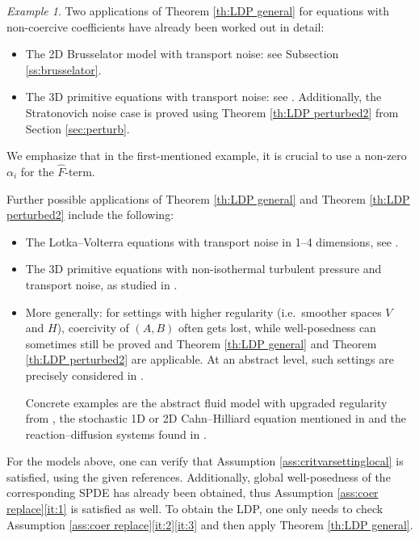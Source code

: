 \documentclass{amsart}
\newcommand{\<}{\langle}
\newcommand{\?}{\rangle}
\theoremstyle{plain}
\theoremstyle{remark}
\newtheorem{example}[theorem]{Example}
\theoremstyle{plain}
\numberwithin{equation}{section}
\begin{document}
\begin{example}\label{ex:applications}
Two applications of Theorem \ref{th:LDP general} for equations with non-coercive coefficients have already been worked out in detail: 
 \begin{itemize}
  \item The 2D Brusselator model with transport noise: see Subsection \ref{ss:brusselator}. 
 \item The 3D primitive equations  with transport noise: see \cite[Th.\ 2.7]{AT25}. Additionally, the Stratonovich noise case \cite[Th.\ 2.9]{AT25} is  proved using Theorem \ref{th:LDP perturbed2} from Section \ref{sec:perturb}.  
 \end{itemize}
We emphasize that in the first-mentioned example, it is crucial to use a non-zero $\alpha_i$ for the  $\hat{F}$-term. 
 
Further possible applications of Theorem \ref{th:LDP general} and Theorem \ref{th:LDP perturbed2}   include the following: 
 \begin{itemize}  
     \item The Lotka--Volterra equations with transport noise in 1--4 dimensions, see \cite[Th.\ 4.5]{AVreac24}.  
     \item The 3D primitive equations with non-isothermal turbulent pressure and transport noise, as studied in \cite{AHHS25nonisothermal}. 
    \item More generally: for settings  with higher regularity (i.e.\ smoother spaces $V$ and $H$), coercivity of $(A,B)$ often gets lost, while well-posedness can sometimes still be proved and Theorem \ref{th:LDP general} and Theorem \ref{th:LDP perturbed2} are applicable. 
        At an abstract level, such settings are precisely considered in \cite[Th.\ 6.7, Rem.\ 6.8]{AV25survey}. 
        
        Concrete examples are the abstract fluid model with upgraded regularity from \cite[Th.\ 7.12]{AV25survey},  the stochastic 1D or 2D Cahn--Hilliard equation mentioned in \cite[\S7.2, Rem.\ 7.7]{AV25survey} and the reaction–diffusion systems found in \cite[(5.1), Prop.\ 5.1, Rem.\ 5.2]{boschhupkes25}.  
 \end{itemize}
 For the models above, one can verify that Assumption \ref{ass:critvarsettinglocal} is satisfied, using the given references. Additionally,  global well-posedness of the corresponding SPDE has already been obtained, thus Assumption \ref{ass:coer replace}\ref{it:1} is satisfied as well. 
To obtain the LDP, one only needs to check Assumption \ref{ass:coer replace}\ref{it:2}\ref{it:3} and then apply Theorem \ref{th:LDP general}. 
\end{example}
\end{document}
